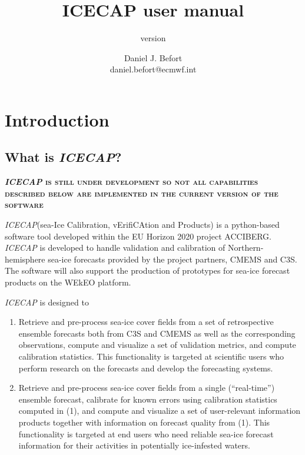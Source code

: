 \documentclass[DIV=10, parskip=full]{scrreprt}
\title{ICECAP user manual}
\subtitle{version \version}
\author{Daniel J. Befort \\ daniel.befort@ecmwf.int}
\newcommand{\ice}{\textit{ICECAP}\xspace}
\newcommand{\highlight}[1]{\textsc{\textbf{#1}}}
\begin{document}
\maketitle

\tableofcontents

\chapter{Introduction}

\section{What is \ice?}
\highlight{\ice is still under development so not all capabilities described below are implemented in the current version of the software}

\ice (sea-Ice Calibration, vErifiCAtion and Products) is a python-based software tool developed within the EU Horizon 2020 project ACCIBERG. \ice is developed to handle validation and calibration of Northern-hemisphere sea-ice forecasts provided by the project partners, CMEMS and C3S. The software will also support the production of prototypes for sea-ice forecast products on the WEkEO platform. 

\ice is designed to 
\begin{enumerate}
	\item Retrieve and pre-process sea-ice cover fields from a set of retrospective ensemble forecasts both from C3S and CMEMS as well as the corresponding observations, compute and visualize a set of validation metrics, and compute calibration statistics. This functionality is targeted at scientific users who perform research on the forecasts and develop the forecasting systems.
	\item Retrieve and pre-process sea-ice cover fields from a single (“real-time”) ensemble forecast, calibrate for known errors using calibration statistics computed in (1), and compute and visualize a set of user-relevant information products together with information on forecast quality from (1). This functionality is targeted at end users who need reliable sea-ice forecast information for their activities in potentially ice-infested waters.
\end{enumerate}
\end{document}
